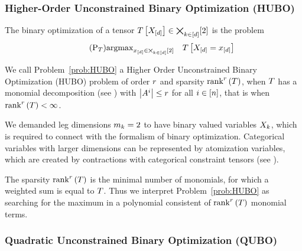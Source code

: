 \subsubsection{Higher-Order Unconstrained Binary Optimization (HUBO)}



\begin{definition}
	The binary optimization of a tensor $T\left[X_{[d]}\right]\in\bigtimes_{k\in[d]}[2]$ is the problem
	\begin{align}\tag{$\mathrm{P}_{\hypercore}$}\label{prob:HUBO}
		\argmax_{\shortcatindices\in\atomstates} \quad \hypercoreat{\indexedshortcatvariables} 
	\end{align}
	
	We call Problem~\ref{prob:HUBO} a Higher Order Unconstrained Binary Optimization (HUBO) problem of order $r$ and sparsity $\mathrm{rank}^{r}\left(T\right)$, when $T$ has a monomial decomposition (see ) with $\left|A^{i}\right|\leq r$ for all $i\in[n]$, that is when $\mathrm{rank}^{r}\left(T\right)<\infty$.
	
	
\end{definition}


\begin{remark}
	We demanded leg dimensions $m_{k}=2$ to have binary valued variables $X_{k}$, which is required to connect with the formalism of binary optimization.
	Categorical variables with larger dimensions can be represented by atomization variables, which are created by contractions with categorical constraint tensors (see ).
\end{remark}


The sparsity $\mathrm{rank}^{r}\left(T\right)$ is the minimal number of monomials, for which a weighted sum is equal to $T$.
Thus we interpret Problem~\ref{prob:HUBO} as searching for the maximum in a polynomial consistent of $\mathrm{rank}^{r}\left(T\right)$ monomial terms.



\subsubsection{Quadratic Unconstrained Binary Optimization (QUBO)}


